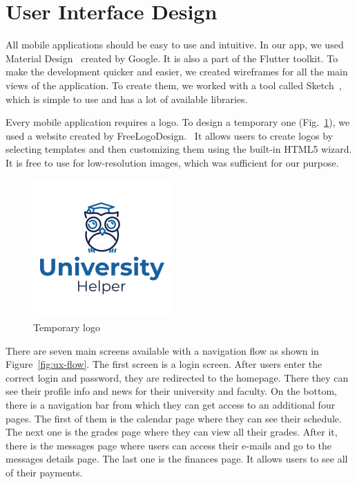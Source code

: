 \section{User Interface Design}

All mobile applications should be easy to use and intuitive. In our app, we used Material Design~\cite{material-design} created by Google. It is also a part of the Flutter toolkit. To make the development quicker and easier, we created wireframes for all the main views of the application. To create them, we worked with a tool called Sketch~\cite{sketch}, which is simple to use and has a lot of available libraries.

Every mobile application requires a logo. To design a temporary one (Fig.~\ref{fig:app-logo}), we used a website created by FreeLogoDesign.~\cite{freelogodesign} It allows users to create logos by selecting templates and then customizing them using the built-in HTML5 wizard. It is free to use for low-resolution images, which was sufficient for our purpose.

\begin{figure}[htb]
    \centering
    \includegraphics[scale=.9]{fig03/logo.png}
    \caption{Temporary logo}
    \label{fig:app-logo}
\end{figure}

There are seven main screens available with a navigation flow as shown in Figure~\ref{fig:ux-flow}. The first screen is a login screen. After users enter the correct login and password, they are redirected to the homepage. There they can see their profile info and news for their university and faculty. On the bottom, there is a navigation bar from which they can get access to an additional four pages. The first of them is the calendar page where they can see their schedule. The next one is the grades page where they can view all their grades. After it, there is the messages page where users can access their e-mails and go to the messages details page. The last one is the finances page. It allows users to see all of their payments.

